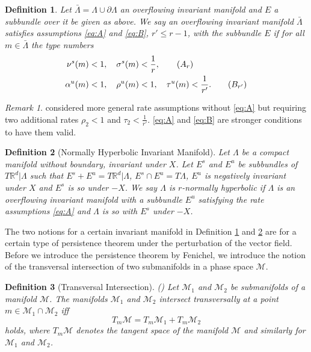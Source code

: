 \documentclass[a4paper,11pt]{article}
\newtheorem{definition}{Definition}[section]
\theoremstyle{remark}
\newtheorem{remark}{Remark}[section]
\begin{document}
\begin{definition} \label{def:over}
Let $\bar{\Lambda}=\Lambda \cup \partial\Lambda$  an overflowing invariant manifold and $E$ a subbundle over it be given as above. We say an overflowing invariant manifold $\bar{\Lambda}$ satisfies assumptions \eqref{eq:A} and \eqref{eq:B}, $r'\le r-1$, with the subbundle $E$ if for all $m\in \bar{\Lambda}$ the type numbers
\begin{align}
\nu^s(m)&<1, \quad \sigma^s(m)<\frac{1}{r}, \label{eq:A}\tag{$A_r$}   \\
\alpha^u(m)&<1, \quad \rho^u(m)<1, \quad \tau^u(m)<\frac{1}{r'}. \label{eq:B}\tag{$B_{r'}$}  
\end{align}
\end{definition}
\begin{remark}
 \cite{fenichel_asymptotic_1977} considered more general rate assumptions without \eqref{eq:A} but requiring two additional rates $\rho_2<1$ and $\tau_2<\frac{1}{r'}$. \eqref{eq:A} and \eqref{eq:B} are stronger conditions to have them valid. %
\end{remark}
\begin{definition}[Normally Hyperbolic Invariant Manifold] \label{def:nhim}
 Let $\Lambda$ be a compact manifold without boundary, invariant under $X$. Let $E^s$ and $E^u$ be subbundles of $T \mathbb{R}^d|\Lambda$ such that $E^s + E^u = T \mathbb{R}^d|\Lambda$, $E^s\cap E^u=T\Lambda$, $E^u$ is negatively invariant under $X$ and $E^s$ is so under $-X$. We say $\Lambda$ is $r$-normally hyperbolic if $\Lambda$ is an overflowing invariant manifold with a subbundle $E^u$ satisfying the rate assumptions \eqref{eq:A} and $\Lambda$ is so with $E^s$ under $-X$. 
\end{definition}
The two notions for a certain invariant manifold in Definition \ref{def:over} and \ref{def:nhim} are for a certain type of persistence theorem under the perturbation of the vector field. Before we introduce the persistence theorem by Fenichel, we introduce the notion of the transversal intersection of two submanifolds in a phase space $\mathcal{M}$.
\begin{definition}[Transversal Intersection]  (\cite[Definition 3.1]{Sz1991})
 Let ${\mathcal{M}}_1$ and ${\mathcal{M}}_2$ be submanifolds of a manifold ${\mathcal{M}}$. The manifolds ${\mathcal{M}}_1$ and ${\mathcal{M}}_2$ intersect transversally at a point $m\in{\mathcal{M}}_1\cap {\mathcal{M}}_2$ iff 
 $$T_m{\mathcal{M}} =  T_m{\mathcal{M}}_1+T_m{\mathcal{M}}_2$$
 holds, where $T_m\mathcal{M}$ denotes the tangent space of the manifold $\mathcal{M}$ and similarly for $\mathcal{M}_1$ and $\mathcal{M}_2$.
\end{definition}
\end{document}
